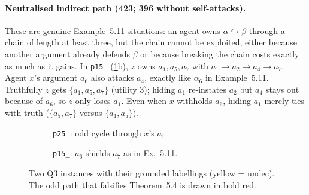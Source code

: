 \documentclass[11pt,a4paper]{article}
\newcommand{\odd}{\hookrightarrow}
\newcommand{\code}[1]{{\let\origus\_\renewcommand{\_}{\origus\allowbreak}\texttt{#1}}}
\theoremstyle{definition}
\begin{document}
\paragraph{Neutralised indirect path (423; 396 without self-attacks).} These are genuine
Example~5.11 situations: an agent owns $\alpha\odd\beta$ through a chain of length at least three, but
the chain cannot be exploited, either because another argument already defends $\beta$ or because
breaking the chain costs exactly as much as it gains. In \code{p15\_0402} (\cref{fig:q3}b), $z$ owns
$a_1,a_5,a_7$ with $a_1\to a_2\to a_4\to a_7$. Agent $x$'s argument $a_6$ also attacks $a_4$, exactly
like $\alpha_6$ in Example~5.11. Truthfully $z$ gets $\{a_1,a_5,a_7\}$ (utility 3); hiding $a_1$
re-instates $a_2$ but $a_4$ stays \textsf{out} because of $a_6$, so $z$ only loses $a_1$. Even when
$x$ withholds $a_6$, hiding $a_1$ merely ties with truth ($\{a_5,a_7\}$ versus $\{a_1,a_5\}$).

\begin{figure}[H]
\centering
\begin{subfigure}{0.42\textwidth}\centering
{}
\caption{\code{p25\_0187}: odd cycle through $x$'s $a_1$.}
\end{subfigure}\hfill
\begin{subfigure}{0.55\textwidth}\centering
{}
\caption{\code{p15\_0402}: $a_6$ shields $a_7$ as in Ex.~5.11.}
\end{subfigure}
\caption{Two Q3 instances with their grounded labellings (yellow = \textsf{undec}). The odd path that
falsifies Theorem~5.4 is drawn in bold red.}\label{fig:q3}
\end{figure}
\end{document}
